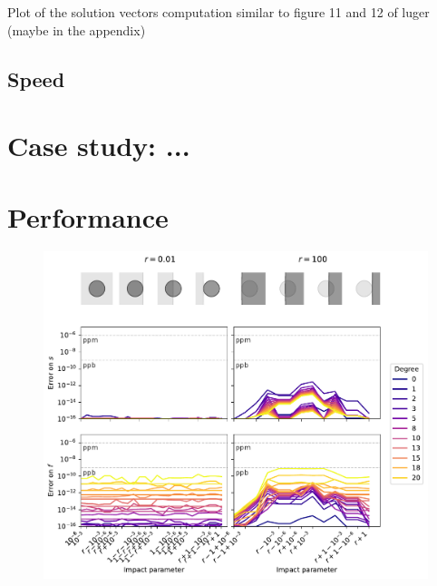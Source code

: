 \documentclass[modern]{aastex631}
\begin{document}
Plot of the solution vectors computation similar to figure 11 and 12 of luger (maybe in the appendix)

\subsection{Speed}\label{speed}



\section{Case study: ...}

\appendix

\section{Performance}
\begin{figure}[H]
    \begin{center}
        \includegraphics[width=\textwidth]{../workflows/precision/figures/error_starry.pdf}
        \caption{}
        \label{fig:precision_s_starry}
    \end{center}
\end{figure}


\end{document}
